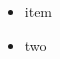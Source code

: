 \documentclass[11pt]{article}
\author{root}
\date{\today}
\title{}
\begin{document}
\tableofcontents

\begin{itemize}
\item item

\item two
\end{itemize}
\end{document}
